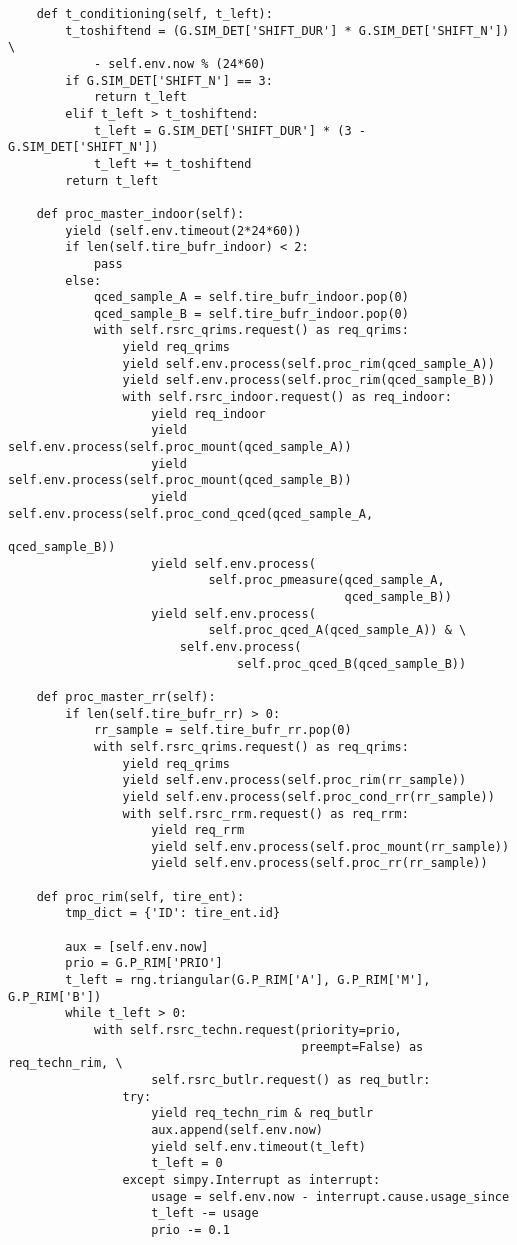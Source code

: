 \begin{verbatim}
    def t_conditioning(self, t_left):
        t_toshiftend = (G.SIM_DET['SHIFT_DUR'] * G.SIM_DET['SHIFT_N']) \
            - self.env.now % (24*60)
        if G.SIM_DET['SHIFT_N'] == 3:
            return t_left
        elif t_left > t_toshiftend:
            t_left = G.SIM_DET['SHIFT_DUR'] * (3 - G.SIM_DET['SHIFT_N'])
            t_left += t_toshiftend
        return t_left

    def proc_master_indoor(self):
        yield (self.env.timeout(2*24*60))
        if len(self.tire_bufr_indoor) < 2:
            pass
        else:
            qced_sample_A = self.tire_bufr_indoor.pop(0)
            qced_sample_B = self.tire_bufr_indoor.pop(0)
            with self.rsrc_qrims.request() as req_qrims:
                yield req_qrims
                yield self.env.process(self.proc_rim(qced_sample_A))
                yield self.env.process(self.proc_rim(qced_sample_B))
                with self.rsrc_indoor.request() as req_indoor:
                    yield req_indoor
                    yield self.env.process(self.proc_mount(qced_sample_A))
                    yield self.env.process(self.proc_mount(qced_sample_B))
                    yield self.env.process(self.proc_cond_qced(qced_sample_A,
                                                               qced_sample_B))
                    yield self.env.process(
                            self.proc_pmeasure(qced_sample_A,
                                               qced_sample_B))
                    yield self.env.process(
                            self.proc_qced_A(qced_sample_A)) & \
                        self.env.process(
                                self.proc_qced_B(qced_sample_B))

    def proc_master_rr(self):
        if len(self.tire_bufr_rr) > 0:
            rr_sample = self.tire_bufr_rr.pop(0)
            with self.rsrc_qrims.request() as req_qrims:
                yield req_qrims
                yield self.env.process(self.proc_rim(rr_sample))
                yield self.env.process(self.proc_cond_rr(rr_sample))
                with self.rsrc_rrm.request() as req_rrm:
                    yield req_rrm
                    yield self.env.process(self.proc_mount(rr_sample))
                    yield self.env.process(self.proc_rr(rr_sample))

    def proc_rim(self, tire_ent):
        tmp_dict = {'ID': tire_ent.id}

        aux = [self.env.now]
        prio = G.P_RIM['PRIO']
        t_left = rng.triangular(G.P_RIM['A'], G.P_RIM['M'], G.P_RIM['B'])
        while t_left > 0:
            with self.rsrc_techn.request(priority=prio,
                                         preempt=False) as req_techn_rim, \
                    self.rsrc_butlr.request() as req_butlr:
                try:
                    yield req_techn_rim & req_butlr
                    aux.append(self.env.now)
                    yield self.env.timeout(t_left)
                    t_left = 0
                except simpy.Interrupt as interrupt:
                    usage = self.env.now - interrupt.cause.usage_since
                    t_left -= usage
                    prio -= 0.1


\end{verbatim}
